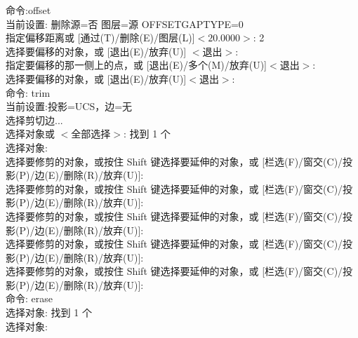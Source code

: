 命令:offset\\
当前设置: 删除源=否  图层=源  OFFSETGAPTYPE=0\\
指定偏移距离或 [通过(T)/删除(E)/图层(L)]$ <20.0000>$:  2\\
选择要偏移的对象，或 [退出(E)/放弃(U)] $<$退出$>$:\\
指定要偏移的那一侧上的点，或 [退出(E)/多个(M)/放弃(U)]$ <$退出$>$:\\
选择要偏移的对象，或 [退出(E)/放弃(U)]$ <$退出$>$:\\
命令: trim\\
当前设置:投影=UCS，边=无\\
选择剪切边...\\
选择对象或 $<$全部选择$>$:  找到 1 个\\
选择对象:\\
选择要修剪的对象，或按住 Shift 键选择要延伸的对象，或
[栏选(F)/窗交(C)/投影(P)/边(E)/删除(R)/放弃(U)]:\\
选择要修剪的对象，或按住 Shift 键选择要延伸的对象，或
[栏选(F)/窗交(C)/投影(P)/边(E)/删除(R)/放弃(U)]:\\
选择要修剪的对象，或按住 Shift 键选择要延伸的对象，或
[栏选(F)/窗交(C)/投影(P)/边(E)/删除(R)/放弃(U)]:\\
选择要修剪的对象，或按住 Shift 键选择要延伸的对象，或
[栏选(F)/窗交(C)/投影(P)/边(E)/删除(R)/放弃(U)]:\\
选择要修剪的对象，或按住 Shift 键选择要延伸的对象，或
[栏选(F)/窗交(C)/投影(P)/边(E)/删除(R)/放弃(U)]:\\
命令: erase\\
选择对象: 找到 1 个\\
选择对象:\\

